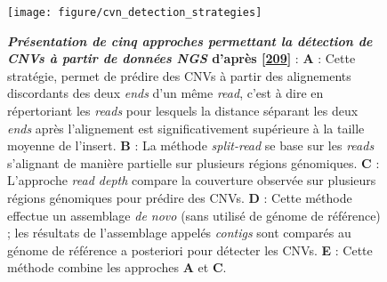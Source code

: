 \documentclass[12pt,a4paper,twoside]{ugathesis}
\theoremstyle{definition}
\theoremstyle{definition}
\theoremstyle{definition}
\theoremstyle{remark}
\begin{document}
\begin{figure}

{\centering \texttt{[image: figure/cvn\_detection\_strategies]} 

}

\caption[Présentation de cinq approches permettant la détection de CNVs à partir de données NGS]{\textbf{\emph{Présentation de cinq approches
permettant la détection de CNVs à partir de données NGS} d'après
{[}\protect\hyperlink{ref-Zhao2013}{209}{]}} : \textbf{A} : Cette
stratégie, permet de prédire des CNVs à partir des alignements
discordants des deux \emph{ends} d'un même \emph{read}, c'est à dire en
répertoriant les \emph{reads} pour lesquels la distance séparant les
deux \emph{ends} après l'alignement est significativement supérieure à
la taille moyenne de l'insert. \textbf{B} : La méthode \emph{split-read}
se base sur les \emph{reads} s'alignant de manière partielle sur
plusieurs régions génomiques. \textbf{C} : L'approche \emph{read depth}
compare la couverture observée sur plusieurs régions génomiques pour
prédire des CNVs. \textbf{D} : Cette méthode effectue un assemblage
\emph{de novo} (sans utilisé de génome de référence) ; les résultats de
l'assemblage appelés \emph{contigs} sont comparés au génome de référence
a posteriori pour détecter les CNVs. \textbf{E} : Cette méthode combine
les approches \textbf{A} et \textbf{C}.}\label{fig:pictcnvdetection}
\end{figure}


















\newpage
\end{document}
